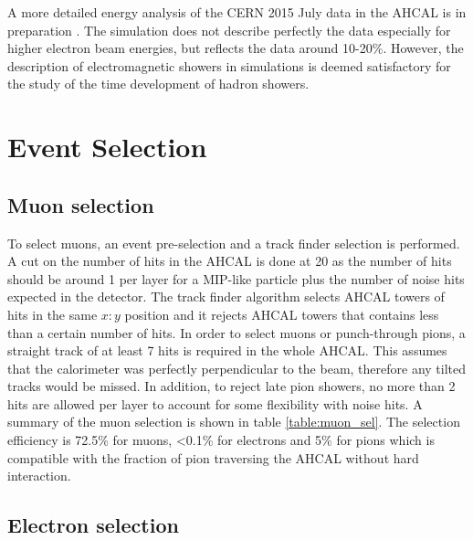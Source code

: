 \documentclass{JINST}
\begin{document}
A more detailed energy analysis of the CERN 2015 July data in the AHCAL is in preparation \cite{AmbraPrivate}. The simulation does not describe perfectly the data especially for higher electron beam energies, but reflects the data around 10-20\%. However, the description of electromagnetic showers in simulations is deemed satisfactory for the study of the time development of hadron showers.

\section{Event Selection}

\subsection{Muon selection}

To select muons, an event pre-selection and a track finder \cite{Hartbrich:2016bbz} selection is performed. A cut on the number of hits in the AHCAL is done at 20 as the number of hits should be around 1 per layer for a MIP-like particle plus the number of noise hits expected in the detector. The track finder algorithm selects AHCAL towers of hits in the same $x:y$ position and it rejects AHCAL towers that contains less than a certain number of hits. In order to select muons or punch-through pions, a straight track of at least 7 hits is required in the whole AHCAL. This assumes that the calorimeter was perfectly perpendicular to the beam, therefore any tilted tracks would be missed. In addition, to reject late pion showers, no more than 2 hits are allowed per layer to account for some flexibility with noise hits. A summary of the muon selection is shown in table \ref{table:muon_sel}. The selection efficiency is 72.5\% for muons, <0.1\% for electrons and 5\% for pions which is compatible with the fraction of pion traversing the AHCAL without hard interaction.

\subsection{Electron selection}
\end{document}
